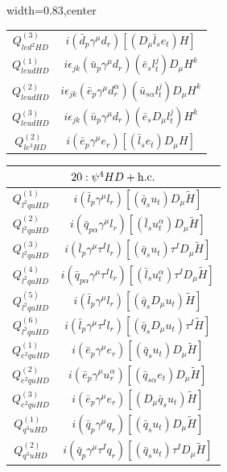 \begin{table}[H]
\begin{center}
\begin{adjustbox}{width=0.83\textwidth,center}
\begin{minipage}[t]{5.4cm}
\begin{tabular}[t]{c|c}
%
$Q_{led^2HD}^{(3)}$  &  $i (\bar d_p \gamma^\mu d_r) [(D_\mu \bar l_s e_t) H]$ \\
%
$Q_{leudHD}^{(1)}$  &  $i \epsilon_{jk} (\bar u_p \gamma^\mu d_r) (\bar e_s l_t^j) D_\mu H^k $ \\
%
$Q_{leudHD}^{(2)}$  &  $i \epsilon_{jk}  (\bar e_p \gamma^\mu d_r^\alpha) (\bar u_{s\alpha} l_t^j) D_\mu H^k$ \\
%
$Q_{leudHD}^{(3)}$  &  $i \epsilon_{jk} (\bar u_p \gamma^\mu d_r) (\bar e_s D_\mu l_t^j) H^k $ \\ \hdashline
%
$Q_{le^3HD}^{(2)}$  &  $i (\bar e_p \gamma^\mu e_r) [(\bar l_s e_t) D_\mu H]$
\end{tabular}
\end{minipage}
\hspace{1cm}
\begin{minipage}[t]{6.1cm}
\renewcommand{\arraystretch}{1.5}
\begin{tabular}[t]{c|c}
\multicolumn{2}{c}{\boldmath$20:\psi^4HD + \mathrm{h.c.}$} \\
\hline
$Q_{l^2quHD}^{(1)}$  &  $i (\bar l_p \gamma^\mu l_r) [(\bar q_s u_t) D_\mu \widetilde H]$ \\
%
$Q_{l^2quHD}^{(2)}$  &  $i (\bar q_{p\alpha} \gamma^\mu l_r) [(\bar l_s u_t^\alpha) D_\mu \widetilde H]$ \\
%
$Q_{l^2quHD}^{(3)}$  &  $i (\bar l_p \gamma^\mu \tau^I l_r) [(\bar q_s u_t) \tau^I D_\mu \widetilde H]$ \\
%
$Q_{l^2quHD}^{(4)}$  &  $i (\bar q_{p\alpha} \gamma^\mu \tau^I l_r) [(\bar l_s u_t^\alpha) \tau^I D_\mu \widetilde H]$ \\
%
$Q_{l^2quHD}^{(5)}$  &  $i (\bar l_p \gamma^\mu l_r) [(\bar q_s D_\mu u_t) \widetilde H]$ \\
%
$Q_{l^2quHD}^{(6)}$  &  $i (\bar l_p \gamma^\mu \tau^I l_r) [(\bar q_s D_\mu u_t) \tau^I \widetilde H]$ \\
%
$Q_{e^2quHD}^{(1)}$  &  $i (\bar e_p \gamma^\mu e_r) [(\bar q_s u_t) D_\mu \widetilde H]$ \\
%
$Q_{e^2quHD}^{(2)}$  &  $i (\bar e_p \gamma^\mu u_r^\alpha) [(\bar q_{s\alpha} e_t) D_\mu \widetilde H]$ \\
%
$Q_{e^2quHD}^{(3)}$  &  $i (\bar e_p \gamma^\mu e_r) [(D_\mu \bar q_s u_t) \widetilde H]$ \\
%
$Q_{q^3uHD}^{(1)}$  &  $i (\bar q_p \gamma^\mu q_r) [(\bar q_s u_t) D_\mu \widetilde H]$ \\
%
$Q_{q^3uHD}^{(2)}$  &  $i (\bar q_p \gamma^\mu \tau^I q_r) [(\bar q_s u_t) \tau^I D_\mu \widetilde H]$ \\

\end{tabular}
\end{minipage}
\end{adjustbox}
\end{center}
\end{table}

